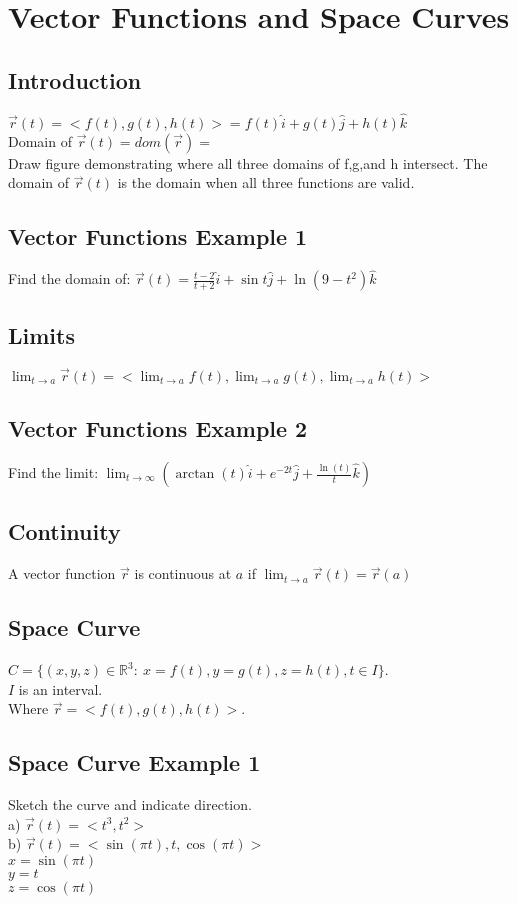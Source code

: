 \documentclass[12pt]{article}
\begin{document}
\section{Vector Functions and Space Curves}
\subsection{Introduction}
$\vec{r} (t) = <f(t),g(t),h(t)>=f(t)\hat{i}+g(t)\hat{j}+h(t)\hat{k} $\\%
Domain of $\vec{r} (t)=dom(\vec{r} ) = $\\%
Draw figure demonstrating where all three domains of f,g,and h intersect.
The domain of $\vec{r} (t) $ is the domain when all three functions are valid.
\subsection{Vector Functions Example 1}
Find the domain of: $\vec{r} (t) = \frac{t-2}{t+2}\hat{i}+\sin t\hat{j}+\ln(9-t^2)\hat{k} $

\subsection{Limits}
$\lim_{t \to a} \vec{r} (t)=<\lim_{t \to a} f(t),	\lim_{t \to a}g(t),\lim_{t \to a} h(t)>$  

\subsection{Vector Functions Example 2}
Find the limit: $\lim_{t \to \infty} (\arctan(t)\hat{i}+e^{-2t}\hat{j}+\frac{\ln(t)}{t}\hat{k})$

\subsection{Continuity}
A vector function $\vec{r}  $ is continuous at $a$ if $\lim_{t \to a} \vec{r} (t) = \vec{r} (a)  $

\subsection{Space Curve}
$C = \{(x,y,z)\in \mathbb{R}^3:\ x=f(t),y=g(t),z=h(t),t\in I\}$.\\%
$I$ is an interval.\\%
Where $\vec{r} =<f(t),g(t),h(t)>$.
\subsection{Space Curve Example 1}
Sketch the curve and indicate direction.\\%
a) $\vec{r} (t) = <t^3,t^2> $\\%
b) $\vec{r} (t)=<\sin{(\pi t)},t,\cos{(\pi t)}> $\\%
$x=\sin{(\pi t)}$\\%
$y=t$\\%
$z=\cos{(\pi t)}$\\%
\end{document}
